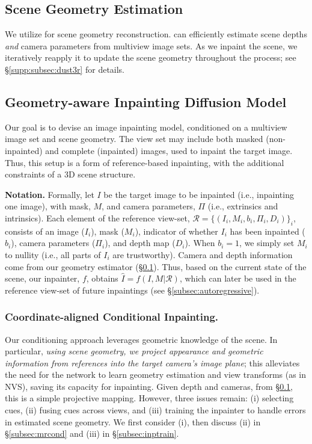 \subsection{Scene Geometry Estimation}
\label{subsec:sge}
We utilize \duster \cite{dust3r} for scene geometry reconstruction.
\duster can efficiently estimate scene depths \textit{and} camera parameters from multiview image sets. As we inpaint the scene, we iteratively reapply it to update the scene geometry throughout the process; see \S\ref{supp:subsec:dust3r} for details.

\subsection{Geometry-aware Inpainting Diffusion Model}
\label{subsec:geo-aware-diffusion}

Our goal is to devise an image inpainting model, conditioned on a multiview image set and scene geometry.
The view set may
include both
masked (non-inpainted) and complete (inpainted) images,
used to inpaint the target image.
Thus, this setup is a form of reference-based inpainting, with the additional constraints of a 3D scene structure.

\noindent
\textbf{Notation.}
Formally, let $I$ be the target image to be inpainted
(i.e.,
inpainting one
image), with mask, $M$,
and camera parameters, $\Pi$ (i.e., extrinsics and intrinsics).
Each element of the reference view-set, $\mathcal{R}=\{ (I_i,M_i,b_i,\Pi_i,D_i)\}_i$, consists of an image ($I_i$), mask ($M_i$), indicator of whether $I_i$ has been inpainted
($b_i$), camera parameters ($\Pi_i$), and depth map ($D_i$).
When $b_i = 1$,
we simply set $M_i$ to nullity (i.e., all parts of $I_i$ are trustworthy).
Camera and depth information
come from our geometry estimator (\S\ref{subsec:sge}).
Thus, based on the current state of the scene, our inpainter, $f$, obtains $\widehat{I} = f(I,M|\mathcal{R})$, 
which can 
later
be
used in the reference view-set of future inpaintings (see \S\ref{subsec:autoregressive}).

\subsubsection{Coordinate-aligned Conditional Inpainting.}
\label{subsubsec:cond-inp}
Our conditioning approach leverages geometric knowledge of the scene.
In particular, \textit{%
using scene geometry, we project appearance and geometric information from references into the target camera's image plane};
this alleviates the need for the network to learn geometry estimation and view transforms (as in NVS), saving its capacity for inpainting.
Given depth and cameras, from \S\ref{subsec:sge}, this is a simple
projective mapping.
However, three issues remain: 
(i) selecting cues,
(ii) fusing cues across views, and
(iii) training the inpainter to handle errors in estimated scene geometry.
We first consider (i), then discuss (ii) in \S\ref{subsec:mrcond} and (iii) in \S\ref{subsec:inptrain}.

